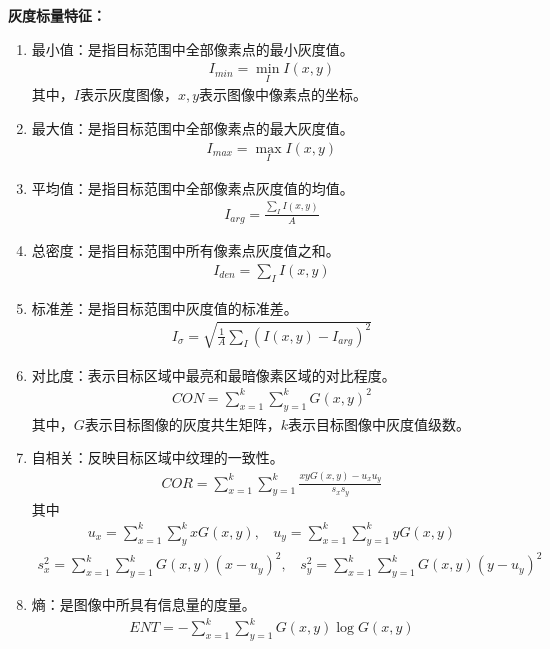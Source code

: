 \textbf{灰度标量特征：}
\begin{enumerate}
\item 最小值：是指目标范围中全部像素点的最小灰度值。
  \begin{eqnarray}
  I_{min} = \min_{I}I(x,y)
  \end{eqnarray}
  其中，$I$表示灰度图像，$x,y$表示图像中像素点的坐标。
\item 最大值：是指目标范围中全部像素点的最大灰度值。
  \begin{eqnarray}
  I_{max}=\max_{I}I(x,y)
  \end{eqnarray}
\item 平均值：是指目标范围中全部像素点灰度值的均值。
  \begin{eqnarray}
  I_{arg} = \frac{\sum_{I}I(x,y)}{A}
  \end{eqnarray}
\item 总密度：是指目标范围中所有像素点灰度值之和。
  \begin{eqnarray}
  I_{den}=\sum_{I}I(x,y)
  \end{eqnarray}
\item 标准差：是指目标范围中灰度值的标准差。
  \begin{eqnarray}
  I_{\sigma} = \sqrt{\frac{1}{A}\sum_{I}(I(x,y)-I_{arg})^{2}}
  \end{eqnarray}
\item 对比度：表示目标区域中最亮和最暗像素区域的对比程度。
  \begin{eqnarray}
  CON = \sum^{k}_{x=1}\sum^{k}_{y=1}{G(x,y)}^2
  \end{eqnarray}
  其中，$G$表示目标图像的灰度共生矩阵，$k$表示目标图像中灰度值级数。
\item 自相关：反映目标区域中纹理的一致性。
  \begin{eqnarray}
  COR = \sum^{k}_{x=1}\sum^{k}_{y=1}\frac{xyG(x,y)-u_{x}u_{y}}{s_{x}s_{y}}
  \end{eqnarray}
  其中
  \begin{eqnarray}
  u_{x}=\sum^{k}_{x=1}\sum^{k}_{y} x G(x,y),  ~~~~  u_{y}=\sum^{k}_{x=1}\sum^{k}_{y=1} y G(x,y)
  \end{eqnarray}
  \begin{eqnarray}
  s^{2}_{x}=\sum^{k}_{x=1}\sum^{k}_{y=1}G(x,y)(x-u_{y})^{2},  ~~~~   s^{2}_{y}=\sum^{k}_{x=1}\sum^{k}_{y=1}G(x,y)(y-u_{y})^{2}
  \end{eqnarray}
\item 熵：是图像中所具有信息量的度量。
  \begin{eqnarray}
  ENT = -\sum^{k}_{x=1}\sum^{k}_{y=1}G(x,y)\log G(x,y)
  \end{eqnarray}
\end{enumerate}

